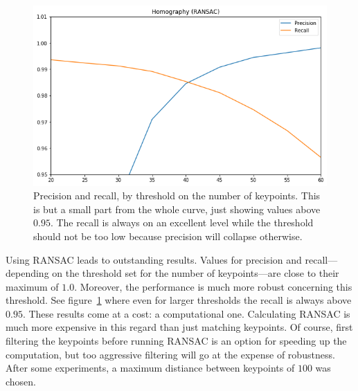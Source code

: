 \documentclass{ltjarticle}
\begin{document}
\begin{figure}
    \centering
    \includegraphics[width=\linewidth]{ransac-performance.png}
    \caption[RANSAC performance]{Precision and recall, by threshold on the number of keypoints. This is but a small part from the whole curve, just showing values above $0.95$. The recall is always on an excellent level while the threshold should not be too low because precision will collapse otherwise.}
    \label{fig:ransac}
\end{figure}

Using RANSAC leads to outstanding results. Values for precision and recall---depending on the threshold set for the number of keypoints---are close to their maximum of $1.0$. Moreover, the performance is much more robust concerning this threshold. See figure~\ref{fig:ransac} where even for larger thresholds the recall is always above $0.95$. These results come at a cost: a computational one. Calculating RANSAC is much more expensive in this regard than just matching keypoints. Of course, first filtering the keypoints before running RANSAC is an option for speeding up the computation, but too aggressive filtering will go at the expense of robustness. After some experiments, a maximum distiance between keypoints of $100$ was chosen.
\end{document}
